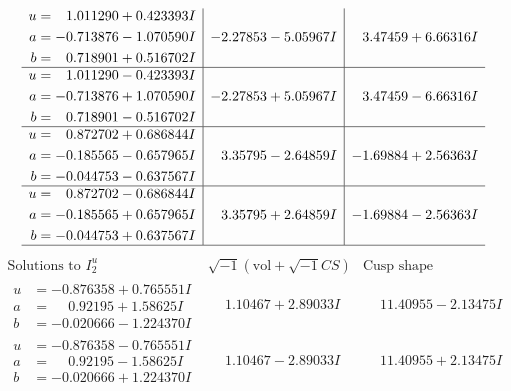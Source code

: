\documentclass[1p]{elsarticle_modified}
\theoremstyle{definition}
\newcommand{\I}{\sqrt{-1}}
\begin{document}
$$\begin{array}{c|c|c}
\begin{aligned}
u &= \phantom{-}1.011290 + 0.423393 I \\
a &= -0.713876 - 1.070590 I \\
b &= \phantom{-}0.718901 + 0.516702 I\end{aligned}
 & -2.27853 - 5.05967 I & \phantom{-}3.47459 + 6.66316 I \\ \hline\begin{aligned}
u &= \phantom{-}1.011290 - 0.423393 I \\
a &= -0.713876 + 1.070590 I \\
b &= \phantom{-}0.718901 - 0.516702 I\end{aligned}
 & -2.27853 + 5.05967 I & \phantom{-}3.47459 - 6.66316 I \\ \hline\begin{aligned}
u &= \phantom{-}0.872702 + 0.686844 I \\
a &= -0.185565 - 0.657965 I \\
b &= -0.044753 - 0.637567 I\end{aligned}
 & \phantom{-}3.35795 - 2.64859 I & -1.69884 + 2.56363 I \\ \hline\begin{aligned}
u &= \phantom{-}0.872702 - 0.686844 I \\
a &= -0.185565 + 0.657965 I \\
b &= -0.044753 + 0.637567 I\end{aligned}
 & \phantom{-}3.35795 + 2.64859 I & -1.69884 - 2.56363 I\\
 \hline 
 \end{array}$$\newpage$$\begin{array}{c|c|c}  
\text{Solutions to }I^u_{2}& \I (\text{vol} + \sqrt{-1}CS) & \text{Cusp shape}\\
 \hline 
\begin{aligned}
u &= -0.876358 + 0.765551 I \\
a &= \phantom{-}0.92195 + 1.58625 I \\
b &= -0.020666 - 1.224370 I\end{aligned}
 & \phantom{-}1.10467 + 2.89033 I & \phantom{-}11.40955 - 2.13475 I \\ \hline\begin{aligned}
u &= -0.876358 - 0.765551 I \\
a &= \phantom{-}0.92195 - 1.58625 I \\
b &= -0.020666 + 1.224370 I\end{aligned}
 & \phantom{-}1.10467 - 2.89033 I & \phantom{-}11.40955 + 2.13475 I \\ \hline\begin{aligned}

\end{aligned}
\end{array}$$
\end{document}
